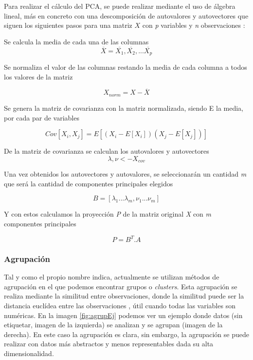 Para realizar el cálculo del PCA, se puede realizar mediante el uso de álgebra lineal, más en concreto con una descomposición de autovalores y autovectores que siguen los siguientes pasos para una matriz \(X\) con \textit{p} variables y \textit{n} observaciones \cite{PCAscratch}:

Se calcula la media de cada una de las columnas
\begin{equation}
    \overline{X} = \overline{X_1}, \overline{X_2}, ... \overline{X_p} 
\end{equation}

Se normaliza el valor de las columnas restando la media de cada columna a todos los valores de la matriz

\begin{equation}
    X_{norm} = X - \overline{X}
\end{equation}

Se genera la matriz de covarianza con la matriz normalizada, siendo E la media, por cada par de variables \cite{covWikipedia}

\begin{equation}
    Cov[X_i, X_j] = E[(X_i - E[X_i])(X_j - E[X_j])]
\end{equation}

De la matriz de covarianza se calculan los autovalores y autovectores
\begin{equation}
    \lambda, \nu <- X_{cov}
\end{equation}

Una vez obtenidos los autovectores y autovalores, se seleccionarán un cantidad \textit{m} que será la cantidad de componentes principales elegidos

\begin{equation}
    B =  [\lambda_1 ... \lambda_m, \nu_1 ...\nu_m ]
\end{equation}

Y con estos calculamos la proyección \textit{P} de la matriz original \textit{X} con \textit{m} componentes principales

\begin{equation}
    P = B^T . A
\end{equation}

\subsubsection{Agrupación}

Tal y como el propio nombre indica, actualmente se utilizan métodos de agrupación en el que podemos encontrar grupos o \textit{clusters}. Esta agrupación se realiza mediante la similitud entre observaciones, donde  la similitud puede ser la distancia euclídea entre las observaciones \cite{james2013introduction}, útil cuando todas las variables son numéricas. En la imagen \ref{fig:agrupEj} podemos ver un ejemplo donde datos (sin etiquetar, imagen de la izquierda) se analizan y se agrupan (imagen de la derecha).  En este caso la agrupación es clara, sin embargo, la agrupación se puede realizar con datos más abstractos y menos representables dada su alta dimensionalidad.


